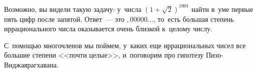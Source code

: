 



Возможно, вы видели такую задачу: у~числа $(1 + \sqrt{2})^{1001}$ найти в~уме
первые пять цифр после запятой.
Ответ~--- это ${,}00000{\ldots}$, то~есть большая степень иррационального числа
оказывается очень близкой к~целому числу.

С~помощью многочленов мы поймем, у~каких еще иррациональных чисел все большие
степени <<почти целые>>, и~поговорим про гипотезу Пизо-Виджаярагхавана.

